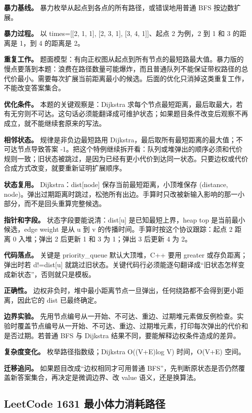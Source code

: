 \textbf{暴力基线。} 暴力枚举从起点到各点的所有路径，或错误地用普通 BFS 按边数扩展。

\textbf{暴力过程。} 以 times=[[2, 1, 1], [2, 3, 1], [3, 4, 1]]、起点 2 为例，2 到 1 和 3 的距离是 1，到 4 的距离是 2。

\textbf{重复工作。} 题面模型：有向正权图从起点到所有节点的最短路最大值。暴力版的慢点要落到本题：浪费在路径数量可能爆炸，而且普通队列不能保证带权路径的总代价最小。需要每次扩展当前距离最小的候选。后面的优化只消掉这类重复工作，不能改变答案集合。

\textbf{优化条件。} 本题的关键观察是：Dijkstra 求每个节点最短距离，最后取最大，若有无穷则不可达。这句话必须能翻译成可维护状态；如果题目条件改变后观察不再成立，就不能继续套原来的写法。

\textbf{相邻状态。} 规律是非负边最短路用 Dijkstra，最后取所有最短距离的最大值；不可达节点导致答案 -1。把这个特例继续拆开看：队列或堆弹出的顺序必须和代价规则一致；旧状态被跳过，是因为已经有更小代价到达同一状态。只要边权或代价合成方式改变，就要重新证明扩展顺序。

\textbf{状态复用。} Dijkstra：dist[node] 保存当前最短距离，小顶堆保存 (distance, node)。弹出过期距离时跳过，松弛所有出边。手算时只改被新输入影响的那一小部分，而不是回头重算完整候选。

\textbf{指针和字段。} 状态字段要能说清：dist[u] 是已知最短上界，heap top 是当前最小候选，edge weight 是从 u 到 v 的传播时间。手算时按这个协议跟踪：起点 2 距离 0 入堆；弹出 2 后更新 1 和 3 为 1；弹出 3 后更新 4 为 2。

\textbf{代码落点。} 关键是 priority\_queue 默认大顶堆，C++ 要用 greater 或存负距离；弹出时若 d!=dist[u] 就跳过旧状态。关键代码行必须能逐句翻译成“旧状态怎样变成新状态”，否则就只是模板。

\textbf{正确性。} 边权非负时，堆中最小距离节点一旦弹出，任何绕路都不会得到更小距离，因此它的 dist 已最终确定。

\textbf{边界实验。} 先用节点编号从一开始、不可达、重边、过期堆元素做反例检查。实验时覆盖节点编号从一开始、不可达、重边、过期堆元素，打印每次弹出的代价和是否过期。若普通 BFS 与 Dijkstra 结果不同，要能解释边权条件造成的差异。

\textbf{复杂度变化。} 枚举路径指数级；Dijkstra O((V+E)log V) 时间，O(V+E) 空间。

\textbf{迁移追问。} 如果题目改成“边权相同才可用普通 BFS”，先判断原状态是否仍然覆盖新答案集合，再决定是微调边界、改 value 语义，还是换算法。

\subsection{LeetCode 1631 最小体力消耗路径}

